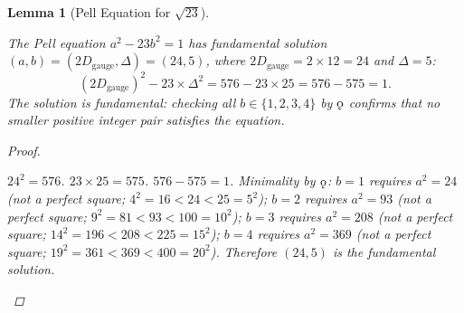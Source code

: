 \documentclass[11pt,letterpaper]{article}
\theoremstyle{plain}
\newtheorem{lemma}[theorem]{Lemma}
\theoremstyle{definition}
\theoremstyle{remark}
\newcommand{\koppa}{\mathbin{\text{\rm\k{o}}}}
\newcommand{\Dg}{D_{\mathrm{gauge}}}
\begin{document}
\begin{lemma}[Pell Equation for $\sqrt{23}$]\label{thm:pell-23}
\begin{rsbox}
The Pell equation $a^2 - 23b^2 = 1$ has fundamental solution
$(a,b) = (2\Dg,\Delta) = (24,5)$, where $2\Dg = 2\times12 = 24$
and $\Delta = 5$:
\[
(2\Dg)^2 - 23\times\Delta^2 = 576 - 23\times25 = 576 - 575 = 1.
\]
The solution is fundamental: checking all $b\in\{1,2,3,4\}$ by
$\koppa$ confirms that no smaller positive integer pair satisfies
the equation.
\end{rsbox}
\begin{proof}
\begin{rsbox}
$24^2 = 576$. $23\times 25 = 575$. $576 - 575 = 1$.
Minimality by $\koppa$: $b=1$ requires $a^2=24$ (not a perfect square;
$4^2=16<24<25=5^2$); $b=2$ requires $a^2=93$ (not a perfect square;
$9^2=81<93<100=10^2$); $b=3$ requires $a^2=208$ (not a perfect square;
$14^2=196<208<225=15^2$); $b=4$ requires $a^2=369$ (not a perfect square;
$19^2=361<369<400=20^2$). Therefore $(24,5)$ is the fundamental solution.
\end{rsbox}
\end{proof}
\end{lemma}
\end{document}
